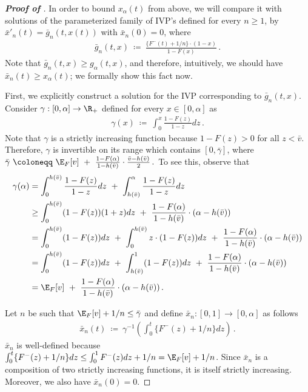 \begin{proof}[\textbf{Proof of }]
	In order to bound $x_\alpha(t)$ from above, we will compare it with solutions of the parameterized family of IVP's defined for every $n \geq 1$, by $  \bar x'_n(t) = \bar g_n(t,x(t))$ with $\bar x_n(0) =0$, where
	\begin{align}\label{eq:IVP-n}
		\bar g_n(t,x)\ \coloneqq\ \frac{\{F^-(t) + 1/n\} \cdot  (1 - x)}{1 - F(x)} \,.
	\end{align}
	Note that $\bar g_n(t,x) \geq g_\alpha(t,x)$, and therefore, intuitively, we should have $\bar x_n(t) \geq x_\alpha(t)$; we formally show this fact now.
	
	First, we explicitly construct a solution for the IVP corresponding to $\bar g_n(t,x)$. Consider $\gamma: [0,\alpha] \to \R_+$ defined for every $x \in [0,\alpha]$ as 
	\begin{align*}
		\gamma(x)\ \coloneqq\ \int_{0}^x \frac{1 - F(z)}{1 - z} dz\,.
	\end{align*}  
    Note that $\gamma$ is a strictly increasing function because $1 - F(z) > 0$ for all $z < \bar v$. Therefore, $\gamma$ is invertible on its range which contains $[0, \bar \gamma]$, where  $\bar \gamma\ \coloneqq\ \E_F[v]\ +\ \frac{1 - F(\alpha)}{1 - h(\bar v)} \cdot \frac{\bar v - h(\bar v)}{2}\,.$
	To see this, observe that
	\begin{align*}
		\gamma(\alpha) &= \int_{0}^{h(\bar v)} \frac{1 - F(z)}{1 - z} dz\ +\ \int_{h(\bar v)}^\alpha \frac{1 - F(z)}{1 - z} dz\\
		&\geq \int_{0}^{h(\bar v)} (1 - F(z))(1 + z) dz\ +\ \frac{1 - F(\alpha)}{1 - h(\bar v)} \cdot (\alpha - h(\bar v))\\
		&= \int_{0}^{h(\bar v)} (1 - F(z)) dz\ +\ \int_{0}^{h(\bar v)} z \cdot (1 - F(z)) dz\ +\ \frac{1 - F(\alpha)}{1 - h(\bar v)} \cdot (\alpha - h(\bar v))\\
		&= \int_{0}^{h(\bar v)} (1 - F(z)) dz\ +\ \int_{h(\bar v)}^{1} (1 - F(z)) dz\ +\ \frac{1 - F(\alpha)}{1 - h(\bar v)} \cdot (\alpha - h(\bar v))\\
		&= \E_F[v]\ +\ \frac{1 - F(\alpha)}{1 - h(\bar v)} \cdot (\alpha - h(\bar v))\,.
	\end{align*}
	
	
	Let $n$ be such that $\E_F[v] + 1/n \leq \bar \gamma$ and define $\bar x_n: [0,1] \to [0,\alpha]$ as follows
	\begin{align*}
		\bar x_n(t)\ \coloneqq\ \gamma^{-1}\left( \int_0^t \{F^-(z) + 1/n\} dz \right)\,.
	\end{align*}
	$\bar x_n$ is well-defined because $\int_0^t \{F^-(z) + 1/n\} dz \leq \int_0^1 F^-(z) dz + 1/n = \E_F[v] + 1/n$. Since $\bar x_n$ is a composition of two strictly increasing functions, it is itself strictly increasing. Moreover, we also have $\bar x_n(0) =0$.
	

\end{proof}
